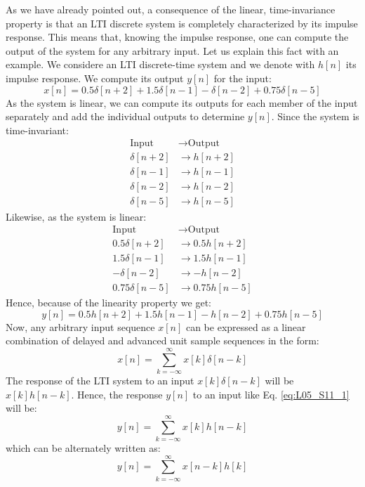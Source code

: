 \documentclass[../../main/main.tex]{subfiles}
\begin{document}
\medskip
{}
As we have already pointed out, a consequence of the linear, time-invariance property is that an LTI discrete system is completely characterized by its impulse response. This means that, knowing the impulse response, one can compute the output of the system for any arbitrary input. Let us explain this fact with an example. We considere an LTI discrete-time system and we denote with \( h[n] \) its impulse response. We compute its output \( y[n] \) for the input:
\begin{equation}
    x[n]
    =
    0.5 \delta[n+2] + 1.5 \delta[n-1] - \delta[n-2] + 0.75 \delta[n-5]
    \label{eq:L05_S08_1}
\end{equation}
As the system is linear, we can compute its outputs for each member of the input separately and add the individual outputs to determine \( y[n] \). Since the system is time-invariant:
\begin{align}
    \text{Input}    &\longrightarrow    \text{Output}   \nonumber   \\
    \delta[n+2]     &\longrightarrow    h[n+2]  \\
    \delta[n-1]     &\longrightarrow    h[n-1]  \\
    \delta[n-2]     &\longrightarrow    h[n-2]  \\
    \delta[n-5]     &\longrightarrow    h[n-5]
\end{align}
Likewise, as the system is linear:
\begin{align}
    \text{Input}    &\longrightarrow    \text{Output}   \nonumber   \\
    0.5 \delta[n+2]     &\longrightarrow    0.5  h[n+2]  \\
    1.5 \delta[n-1]     &\longrightarrow    1.5  h[n-1]  \\
    -   \delta[n-2]     &\longrightarrow    -    h[n-2]  \\
    0.75\delta[n-5]     &\longrightarrow    0.75 h[n-5]
\end{align}
Hence, because of the linearity property we get:
\begin{equation}
    y[n]
    =
    0.5 h[n+2] + 1.5 h[n-1] - h[n-2] + 0.75 h[n-5]
    \label{eq:L05_S10_2}
\end{equation}
Now, any arbitrary input sequence \( x[n] \) can be expressed as a linear combination of delayed and advanced unit sample sequences in the form:
\begin{equation}
    x[n]
    =
    \sum_{k = -\infty}^{\infty} x[k] \delta[n-k]
    \label{eq:L05_S11_1}
\end{equation}
The response of the LTI system to an input \( x[k] \delta[n-k] \) will be \( x[k] h[n-k] \). Hence, the response \( y[n] \) to an input like Eq. \ref{eq:L05_S11_1} will be:
\begin{equation}
    y[n]
    =
    \sum_{k = -\infty}^{\infty} x[k] h[n-k]
    \label{eq:L05_S12_2}
\end{equation}
which can be alternately written as:
\begin{equation}
    y[n]
    =
    \sum_{k = -\infty}^{\infty} x[n-k] h[k]
    \label{eq:L05_S12_3}
\end{equation}
\end{document}
